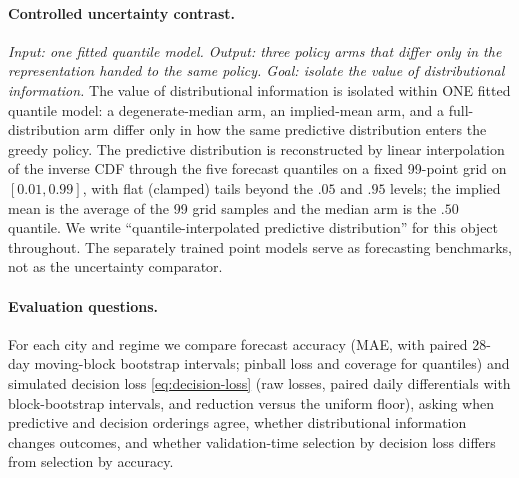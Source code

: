 \paragraph{Controlled uncertainty contrast.}
\emph{Input: one fitted quantile model. Output: three policy arms that
differ only in the representation handed to the same policy. Goal:
isolate the value of distributional information.}
The value of distributional information is isolated within ONE fitted
quantile model: a degenerate-median arm, an implied-mean arm, and a
full-distribution arm differ only in how the same predictive distribution
enters the greedy policy. The predictive distribution is reconstructed by
linear interpolation of the inverse CDF through the five forecast
quantiles on a fixed 99-point grid on $[0.01,0.99]$, with flat (clamped)
tails beyond the $.05$ and $.95$ levels; the implied mean is the average
of the 99 grid samples and the median arm is the $.50$ quantile. We write
``quantile-interpolated predictive distribution'' for this object
throughout. The separately trained point models serve as
forecasting benchmarks, not as the uncertainty comparator.

\paragraph{Evaluation questions.}
For each city and regime we compare forecast accuracy (MAE, with paired
28-day moving-block bootstrap intervals; pinball loss and coverage for
quantiles) and simulated decision loss \eqref{eq:decision-loss} (raw
losses, paired daily differentials with block-bootstrap intervals, and
reduction versus the uniform floor), asking when
predictive and decision orderings agree, whether distributional
information changes outcomes, and whether validation-time selection by
decision loss differs from selection by accuracy.
